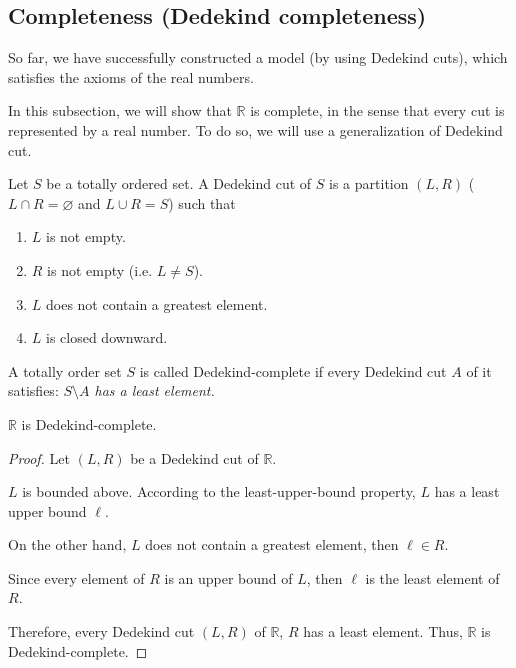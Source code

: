 \subsection{Completeness (Dedekind completeness)}

So far, we have successfully constructed a model (by using Dedekind cuts), which satisfies the axioms of the real numbers.

In this subsection, we will show that $\mathbb{R}$ is complete, in the sense that every cut is represented by a real number. To do so, we will use a generalization of Dedekind cut.

\begin{definition}
    Let $S$ be a totally ordered set. A Dedekind cut of $S$ is a partition $(L, R)$ ($L\cap R = \varnothing$ and $L\cup R = S$) such that
    \begin{enumerate}[label={(\roman*)}]
        \item $L$ is not empty.
        \item $R$ is not empty (i.e. $L\ne S$).
        \item $L$ does not contain a greatest element.
        \item $L$ is closed downward.
    \end{enumerate}
\end{definition}

\begin{definition}
    A totally order set $S$ is called Dedekind-complete if every Dedekind cut $A$ of it satisfies: \textit{$S\setminus A$ has a least element.}
\end{definition}

\begin{theorem}
    $\mathbb{R}$ is Dedekind-complete.
\end{theorem}

\begin{proof}
    Let $(L, R)$ be a Dedekind cut of $\mathbb{R}$.

    $L$ is bounded above. According to the least-upper-bound property, $L$ has a least upper bound $\ell$.

    On the other hand, $L$ does not contain a greatest element, then $\ell\in R$.

    Since every element of $R$ is an upper bound of $L$, then $\ell$ is the least element of $R$.

    Therefore, every Dedekind cut $(L, R)$ of $\mathbb{R}$, $R$ has a least element. Thus, $\mathbb{R}$ is Dedekind-complete.
\end{proof}

